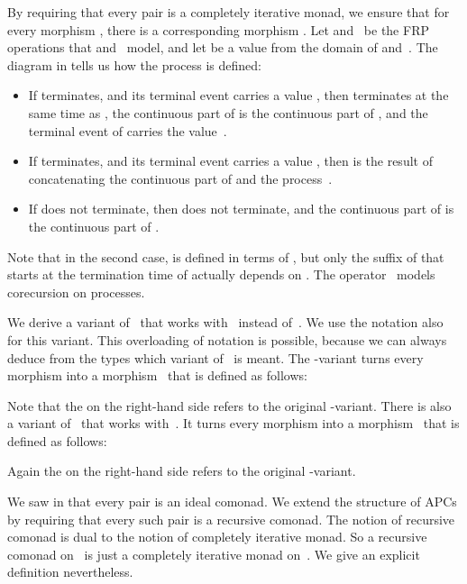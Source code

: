 \documentclass[copyright,creativecommons]{eptcs}
\begin{document}
By requiring that every pair  is a
completely iterative monad, we ensure that for every morphism , there is a corresponding morphism . Let  and~
be the FRP operations that  and~ model, and let  be a value from the
domain of  and~. The diagram in
tells us how the process  is defined:
\begin{itemize}

\item

If  terminates, and its terminal event carries a value , then
 terminates at the same time as , the continuous part of 
is the continuous part of , and the terminal event of  carries the
value~.

\item

If  terminates, and its terminal event carries a value , then
 is the result of concatenating the continuous part of  and the
process~.

\item

If  does not terminate, then  does not terminate, and the
continuous part of  is the continuous part of .

\end{itemize}
Note that in the second case,  is defined in terms of , but
only the suffix of  that starts at the termination time of 
actually depends on . The operator~ models corecursion on
processes.

We derive a variant of~ that works with~ instead of~. We use the
notation  also for this variant. This overloading of notation is
possible, because we can always deduce from the types which variant of~
is meant. The -variant turns every morphism  into a
morphism~ that is defined as follows:

Note that the  on the right-hand side refers to the original
-variant. There is also a variant of~ that works with~. It turns
every morphism  into a morphism~ that is
defined as follows:

Again the  on the right-hand side refers to the original -variant.


We saw in  that every pair
 is an ideal comonad. We extend the
structure of APCs by requiring that every such pair is a recursive comonad. The
notion of recursive comonad is dual to the notion of completely iterative monad.
So a recursive comonad on~ is just a completely iterative monad on~.
We give an explicit definition nevertheless.
\end{document}
